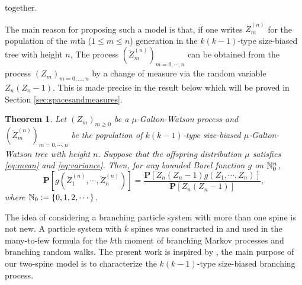 \documentclass[12pt]{amsart}
\newtheorem{thm}{Theorem}[section]
\theoremstyle{remark}
\numberwithin{equation}{section}
\newcommand{\prob}{\mathbf P}
\newcommand{\expr}[1]{\left( #1 \right)}
\newcommand{\brac}[1]{\left[ #1 \right]}
\begin{document}
together.
\par	
The main reason for proposing such a model is that,
if one writes $\ddot Z_m^{(n)}$ for the population of the
$m$th ($1\le m\le n$)
generation in the $k(k-1)$-type size-biased tree with height $n$, 
The process $(\ddot Z_m^{(n)})_{m=0,\cdots,n}$ can be obtained from
the process $(Z_m)_{m=0,\dots,n}$ by a change of measure 
via the random variable $Z_n(Z_n-1)$. 
This is made precise in the result below which will be proved in Section 
\ref{sec:spacesandmeasures}.
 
\begin{thm}
\label{thm:changeofmeasure}
Let $(Z_m)_{m\ge 0}$ be a $\mu$-Galton-Watson process
and $(\ddot Z_m^{(n)})_{m=0,\cdots,n}$ be the population of $k(k-1)$-type size-biased $\mu$-Galton-Watson tree with height $n$. Suppose that the offspring distribution $\mu$ satisfies \eqref{eq:mean} and \eqref{eq:variance}. Then, for any bounded Borel function $g$ on $\mathbb N^{n}_0$,
\begin{equation*}
		\prob\brac{g\expr{\ddot Z_1^{(n)},\cdots,\ddot Z_n^{(n)}}}
	=
		\frac{\prob\brac{Z_n(Z_n-1) g\expr{Z_1,\cdots, Z_n}}}{\prob\brac{Z_n(Z_n-1)}},
\end{equation*}
where $\mathbb N_0:=\{0, 1,2,\cdots\}$.
\end{thm}
\par
The idea of considering a branching particle system 
with more than one spine is not new.
A particle system with $k$ spines  was constructed in \cite{harris2015many} and
used in the  many-to-few formula for the $k$th moment of 
branching Markov processes and branching random walks.
The present work is inspired by \cite{harris2015many}, the main purpose of
our two-spine model is to characterize the $k(k-1)$-type size-biased branching process.
\end{document}
